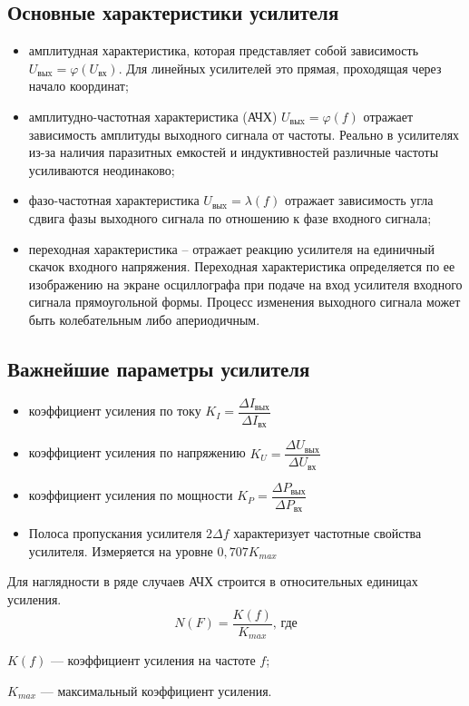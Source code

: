 \documentclass[unicode, 12pt, a4paper, oneside]{article}
\begin{document}
\subsection*{Основные характеристики усилителя}

\begin{itemize}
\item амплитудная характеристика, которая представляет собой зависимость $U_\text{выx} = \varphi(U_\text{вх})$. Для линейных усилителей это прямая, проходящая через начало координат;
\item амплитудно-частотная характеристика (АЧХ) $U_\text{выx} = \varphi(f)$ отражает зависимость амплитуды выходного сигнала от частоты. Реально в усилителях из-за наличия паразитных емкостей и индуктивностей различные частоты усиливаются неодинаково;
\item фазо-частотная характеристика $U_\text{выx} = \lambda(f)$ отражает зависимость угла сдвига фазы выходного сигнала по отношению к фазе входного сигнала;
\item переходная характеристика – отражает реакцию усилителя на единичный скачок входного напряжения. Переходная характеристика определяется по ее изображению на экране осциллографа при подаче на вход усилителя входного сигнала прямоугольной формы. Процесс изменения выходного сигнала может быть колебательным либо апериодичным.
\end{itemize}

\subsection*{Важнейшие параметры усилителя}

\begin{itemize}
\item коэффициент усиления по току $K_{I} = \dfrac{\Delta I_\text{вых}}{\Delta I_\text{вх}}$
\item коэффициент усиления по напряжению $K_{U} = \dfrac{\Delta U_\text{вых}}{\Delta U_\text{вх}}$
\item коэффициент усиления по мощности $K_{P} = \dfrac{\Delta P_\text{вых}}{\Delta P_\text{вх}}$
\item Полоса пропускания усилителя $2\Delta f$ характеризует частотные свойства усилителя. Измеряется на уровне $0,707 K_{max}$
\end{itemize}

Для наглядности в ряде случаев АЧХ строится в относительных единицах усиления.
\begin{equation}
N(F) = \dfrac{K(f)}{K_{max}}\text{, где}
\end{equation}
\par $K(f)$ --- коэффициент усиления на частоте $f$;
\par $K_{max}$ --- максимальный коэффициент усиления.
\end{document}
